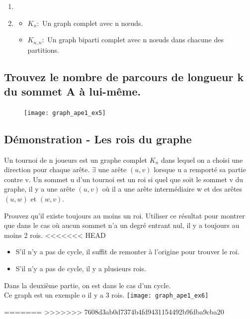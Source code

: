 \begin{solution}
\begin{enumerate}
\item
\item
	\begin{itemize}
	\item $K_{n} :$ Un graph complet avec n nœuds.
	\item $K_{n,n} :$ Un graph biparti complet avec n nœuds dans chacune des partitions.
	\end{itemize}
	\begin{minipage}{0.25\textwidth}
	\begin{flushleft}
	\end{flushleft}
	\end{minipage}
	\begin{minipage}{0.75\textwidth}
	\begin{flushright}
	\end{flushright}
	\end{minipage}
\end{enumerate}
\end{solution}

\subsection{Trouvez le nombre de parcours de longueur k du sommet A à lui-même.}
\begin{figure}
  \center
  \texttt{[image: graph\_ape1\_ex5]}
\end{figure}

\subsection{Démonstration - Les rois du graphe}
Un tournoi de n joueurs est un graphe complet $K_{n}$ dans lequel on a choisi une direction pour chaque arête. $\exists$ une arête $(u,v)$ lorsque u a remporté sa partie contre v. Un sommet u d'un tournoi est un roi si quel que soit le sommet v du graphe, il y a une arête $(u,v)$ où il a une arête intermédiaire w et des arêtes $(u,w)$ et $(w,v)$.

Prouvez qu'il existe toujours au moins un roi.
Utiliser ce résultat pour montrer que dans le cas où aucun sommet n'a un degré entrant nul, il y a toujours au moins 2 rois.
<<<<<<< HEAD
\begin{solution}
\begin{itemize}
\item S'il n'y a pas de cycle, il suffit de remonter à l'origine pour trouver le roi.
\item S'il n'y a pas de cycle, il y a plusieurs rois. 
\end{itemize}

Dans la deuxième partie, on est dans le cas d'un cycle.\\Ce graph est un exemple o il y a 3 rois. \texttt{[image: graph\_ape1\_ex6]}\\

\end{solution}

=======
>>>>>>> 7608d3ab0d7374b4fd9431154492b9fdba9cba20
